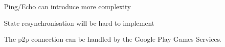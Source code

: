 
\begin{description}[style=nextline]
  \item[R1\label{r1}] Ping/Echo can introduce more complexity
  \item[R2\label{r2}] State resynchronisation will be hard to implement
  \item[N1\label{n1}] The \gls{p2p} connection can be handled by the Google Play Games Services.
\end{description}

